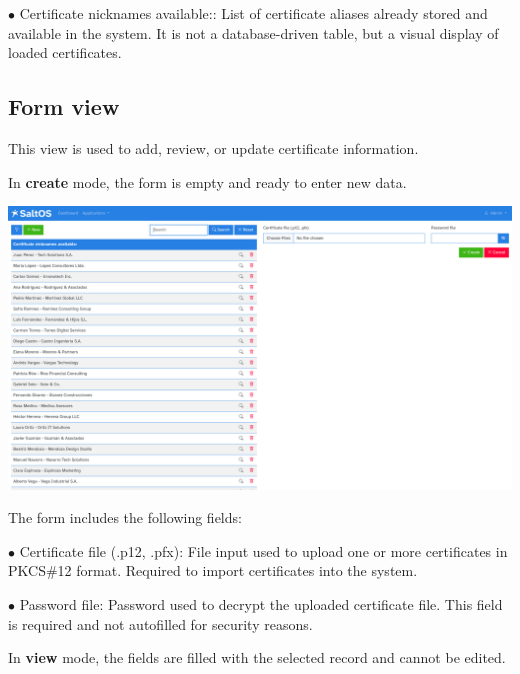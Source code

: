 \documentclass[a4paper]{article}
\begin{document}
\begin{compactitem}
\item[\color{myblue}$\bullet$] Certificate nicknames available:: List of certificate aliases already stored and available in the system. It is not a database-driven table, but a visual display of loaded certificates.
\end{compactitem}

\hypertarget{toc4}{}
\subsection{Form view}

This view is used to add, review, or update certificate information.

In \textbf{create} mode, the form is empty and ready to enter new data.

\begin{center}\includegraphics[width=1\textwidth]{../ujest/snaps/test-screenshots-js-screenshots-certs-certs-create-en-us-1-snap.png}\end{center}

The form includes the following fields:

\begin{compactitem}
\item[\color{myblue}$\bullet$] Certificate file (.p12, .pfx): File input used to upload one or more certificates in PKCS\#12 format. Required to import certificates into the system.
\item[\color{myblue}$\bullet$] Password file: Password used to decrypt the uploaded certificate file. This field is required and not autofilled for security reasons.
\end{compactitem}

In \textbf{view} mode, the fields are filled with the selected record and cannot be edited.
\end{document}
